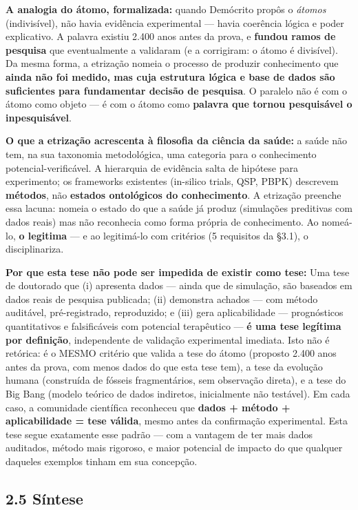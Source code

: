 \documentclass[
  12pt,
]{report}
\begin{document}
\textbf{A analogia do átomo, formalizada:} quando Demócrito propôs o
\emph{átomos} (indivisível), não havia evidência experimental --- havia
coerência lógica e poder explicativo. A palavra existiu 2.400 anos antes
da prova, e \textbf{fundou ramos de pesquisa} que eventualmente a
validaram (e a corrigiram: o átomo é divisível). Da mesma forma, a
etrização nomeia o processo de produzir conhecimento que \textbf{ainda
não foi medido, mas cuja estrutura lógica e base de dados são
suficientes para fundamentar decisão de pesquisa}. O paralelo não é com
o átomo como objeto --- é com o átomo como \textbf{palavra que tornou
pesquisável o inpesquisável}.

\textbf{O que a etrização acrescenta à filosofia da ciência da saúde:} a
saúde não tem, na sua taxonomia metodológica, uma categoria para o
conhecimento potencial-verificável. A hierarquia de evidência salta de
hipótese para experimento; os frameworks existentes (in-silico trials,
QSP, PBPK) descrevem \textbf{métodos}, não \textbf{estados ontológicos
do conhecimento}. A etrização preenche essa lacuna: nomeia o estado do
que a saúde já produz (simulações preditivas com dados reais) mas não
reconhecia como forma própria de conhecimento. Ao nomeá-lo, \textbf{o
legitima} --- e ao legitimá-lo com critérios (5 requisitos da §3.1), o
disciplinariza.

\textbf{Por que esta tese não pode ser impedida de existir como tese:}
Uma tese de doutorado que (i) apresenta dados --- ainda que de
simulação, são baseados em dados reais de pesquisa publicada; (ii)
demonstra achados --- com método auditável, pré-registrado, reproduzido;
e (iii) gera aplicabilidade --- prognósticos quantitativos e
falsificáveis com potencial terapêutico --- \textbf{é uma tese legítima
por definição}, independente de validação experimental imediata. Isto
não é retórica: é o MESMO critério que valida a tese do átomo (proposto
2.400 anos antes da prova, com menos dados do que esta tese tem), a tese
da evolução humana (construída de fósseis fragmentários, sem observação
direta), e a tese do Big Bang (modelo teórico de dados indiretos,
inicialmente não testável). Em cada caso, a comunidade científica
reconheceu que \textbf{dados + método + aplicabilidade = tese válida},
mesmo antes da confirmação experimental. Esta tese segue exatamente esse
padrão --- com a vantagem de ter mais dados auditados, método mais
rigoroso, e maior potencial de impacto do que qualquer daqueles exemplos
tinham em sua concepção.

\hypertarget{suxedntese}{%
\subsection{2.5 Síntese}\label{suxedntese}}
\end{document}
